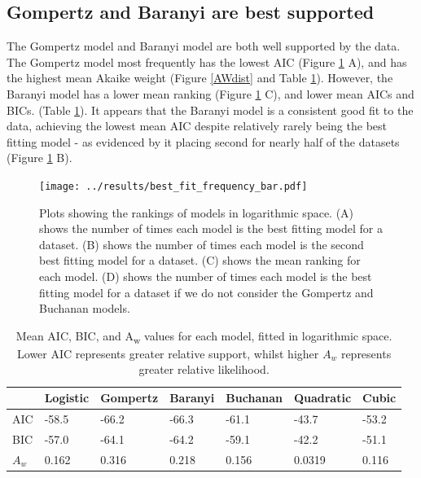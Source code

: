\documentclass[11pt, a4paper]{article}
\begin{document}
\begin{linenumbers}
\subsection{Gompertz and Baranyi are best supported}

The Gompertz model and Baranyi model are both well supported by the data. The Gompertz model most frequently has the lowest AIC (Figure \ref{fig:bestbars} A), and has the highest mean Akaike weight (Figure \ref{AWdist} and Table \ref{tab:meanAICBIC}). However, the Baranyi model has a lower mean ranking (Figure \ref{fig:bestbars} C), and lower mean AICs and BICs. (Table \ref{tab:meanAICBIC}). It appears that the Baranyi model is a consistent good fit to the data, achieving the lowest mean AIC despite relatively rarely being the best fitting model - as evidenced by it placing second for nearly half of the datasets (Figure \ref{fig:bestbars} B).



        \begin{figure}[H]
        \texttt{[image: ../results/best\_fit\_frequency\_bar.pdf]}
        \caption{Plots showing the rankings of models in logarithmic space. (A) shows the number of times each model is the best fitting model for a dataset. (B) shows the number of times each model is the second best fitting model for a dataset. (C) shows the mean ranking for each model. (D) shows the number of times each model is the best fitting model for a dataset if we do not consider the Gompertz and Buchanan models. }
        \label{fig:bestbars}
        \end{figure}
        
         \begin{table}[H]
	\centering
	\begin{tabular}{l|llllll}
       & Logistic & Gompertz & Baranyi & Buchanan & Quadratic & Cubic \\ \hline
AIC & -58.5    & -66.2    & -66.3   & -61.1    & -43.7     & -53.2 \\
BIC & -57.0    & -64.1    & -64.2   & -59.1    & -42.2     & -51.1 \\
$A_w$ & 0.162     & 0.316     & 0.218   & 0.156     & 0.0319     & 0.116
	\end{tabular}
	\caption{Mean AIC, BIC, and A\textsubscript{w}  values for each model, fitted in logarithmic space. Lower AIC represents greater relative support, whilst higher $A_w$ represents greater relative likelihood.}
	\label{tab:meanAICBIC}
	\end{table}





\end{linenumbers}
\end{document}

